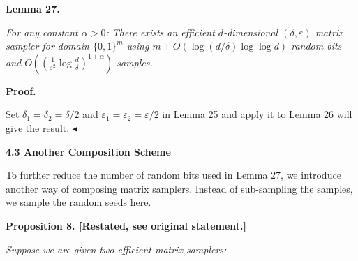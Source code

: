 \documentclass[10pt,a4paper]{article}
\begin{document}


\par\medskip\noindent\textbf{
\textbf{Lemma 27}\textbf{.}
}\par



\emph{For any constant $\alpha>0$:
There exists an efficient $d$-dimensional $(\delta,\varepsilon)$ matrix sampler for domain $\{0,1\}^{m}$ using $m+O(\log(d/\delta)\log\log d)$ random bits and $O((\frac{1}{\varepsilon^{2}}\log\frac{d}{\delta})^{1+\alpha})$ samples.}\par







\par\medskip\noindent\textbf{Proof.}\par




Set $\delta_{1}=\delta_{2}=\delta/2$ and $\varepsilon_{1}=\varepsilon_{2}=\varepsilon/2$ in Lemma 25 and apply it to Lemma 26 will give the result.
$\blacktriangleleft$\par






\par\medskip\noindent\textbf{
4.3 Another Composition Scheme}\par




To further reduce the number of random bits used in Lemma 27, we introduce another way of composing matrix samplers.
Instead of sub-sampling the samples, we sample the random seeds here.\par






\par\medskip\noindent\textbf{
\textbf{Proposition 8}\textbf{.}
[Restated, see original statement.]}\par



\emph{Suppose we are given two efficient matrix samplers:}\par
\end{document}
